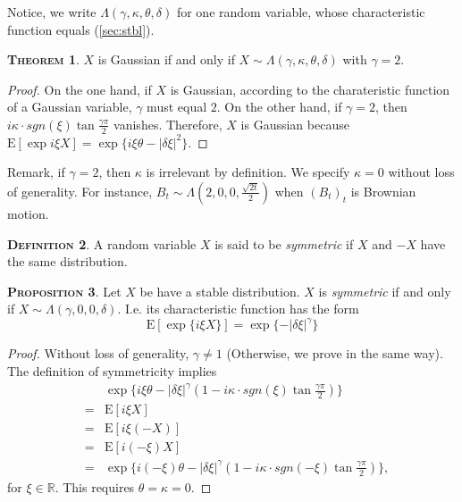 \documentclass[a4paper, twoside, 11pt]{article}
\theoremstyle{definition}
\newtheorem{definition}{\scshape Definition}[section]
\newtheorem{theorem}[definition]{\scshape Theorem}
\newtheorem{proposition}[definition]{\scshape Proposition}
\begin{document}
  Notice, we write $\Lambda(\gamma, \kappa, \theta, \delta)$ for one random variable, whose characteristic function equals (\ref{sec:stbl}).

  \begin{theorem}
	$X$ is Gaussian if and only if $X \sim \Lambda(\gamma, \kappa, \theta, \delta)$ with $\gamma = 2$.
  \end{theorem}
  \begin{proof}
	On the one hand, if $X$ is Gaussian, according to the charateristic function of a Gaussian variable, $\gamma$ must equal $2$. On the other hand, if $\gamma = 2$, then $i\kappa\cdot sgn(\xi)\tan \frac{\gamma\pi}{2}$ vanishes. Therefore, $X$ is Gaussian because $\mathrm{E} [\exp i\xi X]=\exp\{i \xi \theta - |\delta\xi|^2\}$.
  \end{proof}
  Remark, if $\gamma=2$, then $\kappa$ is irrelevant by definition. We specify $\kappa = 0$ without loss of generality. For instance, $B_t \sim \Lambda(2, 0, 0, \frac{\sqrt{2t}}{2})$ when $(B_t)_t$ is Brownian motion.

  \begin{definition}
	A random variable $X$ is said to be \emph{symmetric} if $X$ and $-X$ have the same distribution.
  \end{definition}

  \begin{proposition}
	Let $X$ be have a stable distribution. $X$ is  \emph{symmetric} if and only if $X \sim \Lambda(\gamma, 0, 0, \delta)$. I.e. its characteristic function has the form
	\begin{equation}
	  \mathrm{E}[\exp\{i \xi X\}] = \exp\{-|\delta\xi|^\gamma\}
	\end{equation}
  \end{proposition}
  \begin{proof}
	Without loss of generality, $\gamma\neq 1$ (Otherwise, we prove in the same way).\\
	The definition of symmetricity implies
	\begin{eqnarray*}
	  &&\exp\{i \xi \theta - |\delta\xi|^\gamma(1-i\kappa\cdot sgn(\xi)\tan \frac{\gamma\pi}{2})\}\\
	  &=& \mathrm{E}[i\xi X]\\
	  &=& \mathrm{E}[i\xi (-X)]\\
	  &=& \mathrm{E}[i (-\xi) X]\\
	  &=& \exp\{i (-\xi) \theta - |\delta\xi|^\gamma(1-i\kappa\cdot sgn(-\xi)\tan \frac{\gamma\pi}{2})\},
	\end{eqnarray*}
	for $\xi \in \mathbb{R}$. This requires $\theta=\kappa=0$.
  \end{proof}
\end{document}
